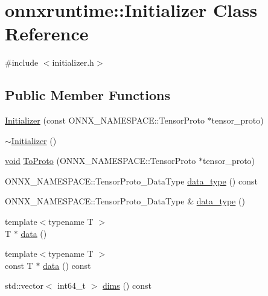 \hypertarget{classonnxruntime_1_1Initializer}{}\section{onnxruntime\+:\+:Initializer Class Reference}
\label{classonnxruntime_1_1Initializer}


{\ttfamily \#include $<$initializer.\+h$>$}

\subsection*{Public Member Functions}
\begin{DoxyCompactItemize}
\item 
\mbox{\hyperlink{classonnxruntime_1_1Initializer_ab587238ad1359aa4c3093570a7d284f6}{Initializer}} (const O\+N\+N\+X\+\_\+\+N\+A\+M\+E\+S\+P\+A\+C\+E\+::\+Tensor\+Proto $\ast$tensor\+\_\+proto)
\item 
\mbox{\hyperlink{classonnxruntime_1_1Initializer_aca6b10021be97cf4d29a8e3282e5d285}{$\sim$\+Initializer}} ()
\item 
\mbox{\hyperlink{mlasi_8h_a88f941d423cb2a819b70a1358982b1a6}{void}} \mbox{\hyperlink{classonnxruntime_1_1Initializer_aae8fbd8bbac151face5adbabd79afff7}{To\+Proto}} (O\+N\+N\+X\+\_\+\+N\+A\+M\+E\+S\+P\+A\+C\+E\+::\+Tensor\+Proto $\ast$tensor\+\_\+proto)
\item 
O\+N\+N\+X\+\_\+\+N\+A\+M\+E\+S\+P\+A\+C\+E\+::\+Tensor\+Proto\+\_\+\+Data\+Type \mbox{\hyperlink{classonnxruntime_1_1Initializer_a3e36e069cce12f715923035dcaa7737b}{data\+\_\+type}} () const
\item 
O\+N\+N\+X\+\_\+\+N\+A\+M\+E\+S\+P\+A\+C\+E\+::\+Tensor\+Proto\+\_\+\+Data\+Type \& \mbox{\hyperlink{classonnxruntime_1_1Initializer_af1f5e14002473968646d2241348b8a62}{data\+\_\+type}} ()
\item 
{\footnotesize template$<$typename T $>$ }\\T $\ast$ \mbox{\hyperlink{classonnxruntime_1_1Initializer_abc96d698ae7eb8006c85bd42e2962a67}{data}} ()
\item 
{\footnotesize template$<$typename T $>$ }\\const T $\ast$ \mbox{\hyperlink{classonnxruntime_1_1Initializer_add31348373037d1af2c7679c76628ff9}{data}} () const
\item 
std\+::vector$<$ int64\+\_\+t $>$ \mbox{\hyperlink{classonnxruntime_1_1Initializer_ada063dd6a826aee594a0449f75372f8e}{dims}} () const
\item 

\end{DoxyCompactItemize}
